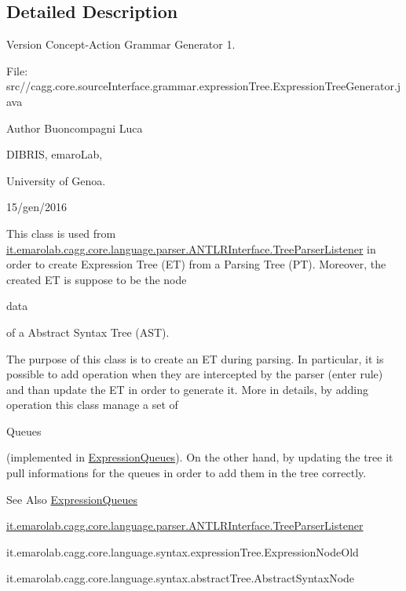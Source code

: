 \subsection{Detailed Description}
\begin{DoxyVersion}{Version}
Concept-\/\-Action Grammar Generator 1. \par
 File\-: src//cagg.core.\-source\-Interface.\-grammar.\-expression\-Tree.\-Expression\-Tree\-Generator.\-java \par

\end{DoxyVersion}
\begin{DoxyAuthor}{Author}
Buoncompagni Luca \par
 D\-I\-B\-R\-I\-S, emaro\-Lab,\par
 University of Genoa. \par
 15/gen/2016 \par

\end{DoxyAuthor}


This class is used from \hyperlink{classit_1_1emarolab_1_1cagg_1_1core_1_1language_1_1parser_1_1ANTLRInterface_1_1TreeParserListener}{it.\-emarolab.\-cagg.\-core.\-language.\-parser.\-A\-N\-T\-L\-R\-Interface.\-Tree\-Parser\-Listener} in order to create Expression Tree (E\-T) from a Parsing Tree (P\-T). Moreover, the created E\-T is suppose to be the node
\begin{DoxyCode}
data 
\end{DoxyCode}
 of a Abstract Syntax Tree (A\-S\-T).\par


The purpose of this class is to create an E\-T during parsing. In particular, it is possible to add operation when they are intercepted by the parser (enter rule) and than update the E\-T in order to generate it. More in details, by adding operation this class manage a set of
\begin{DoxyCode}
Queues 
\end{DoxyCode}
 (implemented in \hyperlink{classit_1_1emarolab_1_1cagg_1_1core_1_1language_1_1syntax_1_1expressionTree_1_1ExpressionTreeGenerator_1_1ExpressionQueues}{Expression\-Queues}). On the other hand, by updating the tree it pull informations for the queues in order to add them in the tree correctly. 

\begin{DoxySeeAlso}{See Also}
\hyperlink{classit_1_1emarolab_1_1cagg_1_1core_1_1language_1_1syntax_1_1expressionTree_1_1ExpressionTreeGenerator_1_1ExpressionQueues}{Expression\-Queues} 

\hyperlink{classit_1_1emarolab_1_1cagg_1_1core_1_1language_1_1parser_1_1ANTLRInterface_1_1TreeParserListener}{it.\-emarolab.\-cagg.\-core.\-language.\-parser.\-A\-N\-T\-L\-R\-Interface.\-Tree\-Parser\-Listener} 

it.\-emarolab.\-cagg.\-core.\-language.\-syntax.\-expression\-Tree.\-Expression\-Node\-Old 

it.\-emarolab.\-cagg.\-core.\-language.\-syntax.\-abstract\-Tree.\-Abstract\-Syntax\-Node 
\end{DoxySeeAlso}


